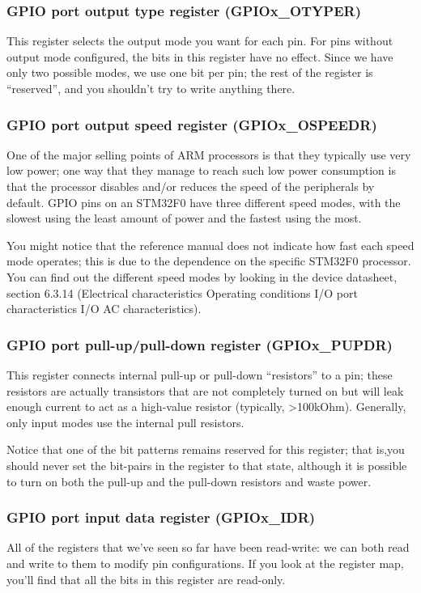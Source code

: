 \documentclass[11pt,fleqn]{book} %
\begin{document}
\subsubsection{GPIO port output type register (GPIOx\_OTYPER)}
This register selects the output mode you want for each pin. For pins without output mode configured, the bits in this register have no effect. Since we have only two possible modes, we use one bit per pin; the rest of the register is ``reserved'', and you shouldn't try to write anything there.

\subsubsection{GPIO port output speed register (GPIOx\_OSPEEDR)}
One of the major selling points of ARM processors is that they typically use very low power; one way that they manage to reach such low power consumption is that the processor disables and/or reduces the speed of the peripherals by default. GPIO pins on an STM32F0 have three different speed modes, with the slowest using the least amount of power and the fastest using the most.

You might notice that the reference manual does not indicate how fast each speed mode operates; this is due to the dependence on the specific STM32F0 processor. You can find out the different speed modes by looking in the device datasheet, section 6.3.14 (Electrical characteristics \textrightarrow Operating conditions \textrightarrow I/O port characteristics \textrightarrow I/O AC characteristics).

\subsubsection{GPIO port pull-up/pull-down register (GPIOx\_PUPDR)}
This register connects internal pull-up or pull-down ``resistors'' to a pin; these resistors are actually transistors that are not completely turned on but will leak enough current to act as a high-value resistor (typically, >100kOhm). Generally, only input modes use the internal pull resistors.

Notice that one of the bit patterns remains reserved for this register; that is,you should never set the bit-pairs in the register to that state, although it is possible to turn on both the pull-up and the pull-down resistors and waste power.

\subsubsection{GPIO port input data register (GPIOx\_IDR)}
All of the registers that we've seen so far have been read-write: we can both read and write to them to modify pin configurations. If you look at the register map, you'll find that all the bits in this register are read-only.
\end{document}
